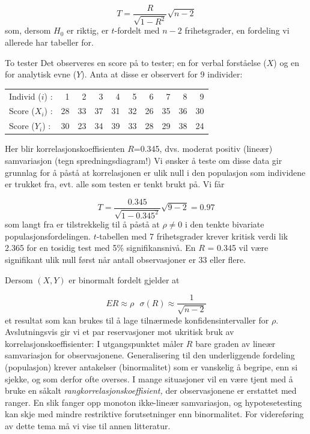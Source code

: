 \[  T=\frac{R}{\sqrt{1-R^2}}\sqrt{n-2}    \]
som, dersom $H_0$ er riktig, er $t$-fordelt med $n-2$ frihetsgrader, en
fordeling vi allerede har tabeller for.\\


\begin{eksempel}{To tester}
Det observeres en score på to tester; en for verbal forståelse
($X$) og en for analytisk evne ($Y$).  Anta at disse er observert for
9 individer:

\begin{center}
\begin{tabular}{lrrrrrrrrr}
Individ ($i$) :&   1  &  2  &  3  &  4  &  5  &  6  &  7  &  8  &  9 \\
Score ($X_i$) :&  28  & 33  & 37  & 31  & 32  & 26  & 35  & 36  & 30 \\ 
Score ($Y_i$) :&  30  & 23  & 34  & 39  & 33  & 28  & 29  & 38  & 24
\end{tabular}
\end{center}
Her blir korrelasjonskoeffisienten $R$=0.345, dvs. moderat positiv 
(lineær) samvariasjon (tegn spredningsdiagram!)  Vi ønsker å
teste om disse data gir grunnlag for å påstå at
korrelasjonen er ulik null i den populasjon som individene er trukket
fra, evt. alle som testen er tenkt brukt på.  Vi får

\[  T=\frac{0.345}{\sqrt{1-0.345^2}}\sqrt{9-2}=0.97    \]
som langt fra er tilstrekkelig til å påstå at $\rho \neq 0$
i den tenkte bivariate populasjonsfordelingen. $t$-tabellen med 7
frihetsgrader krever kritisk verdi lik 2.365 for en tosidig test med
5\% signifikansnivå.  En $R$ = 0.345 vil være signifikant ulik
null først når antall observasjoner er 33 eller flere.
\end{eksempel}

 Dersom $(X,Y)$ er binormalt fordelt gjelder at

\[ ER\approx \rho \mbox{\ \ \ \ \ } \sigma (R)\approx \frac{1}{\sqrt{n-2}} \]
et resultat som kan brukes til å lage tilnærmede konfidensintervaller
for $\rho$.\\

Avslutningsvis gir vi et par reservasjoner mot ukritisk bruk av 
korrelasjonskoeffisienter:  I utgangspunktet måler $R$ bare graden
av lineær samvariasjon for observasjonene.  Generalisering til den
underliggende fordeling (populasjon) krever antakelser (binormalitet)
som er vanskelig å begripe, enn si sjekke, og som derfor ofte overses.
I mange situasjoner vil en være tjent med å bruke en såkalt
{\em rangkorrelasjonskoeffisient,} der observasjonene er erstattet med
ranger.  En slik fanger opp monoton ikke-lineær sam\-varia\-sjon, og 
hypotesetesting kan skje med mindre restriktive forutsetninger enn 
binormalitet.  For videreføring av dette tema må vi vise til annen
litteratur.


